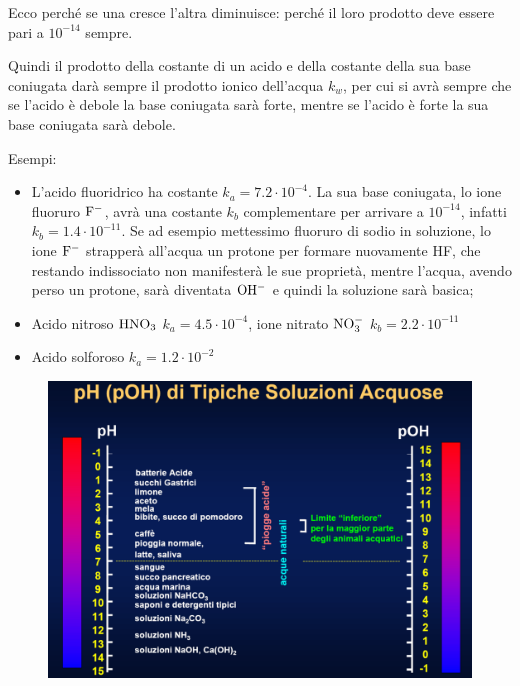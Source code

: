 Ecco perché se una cresce l'altra diminuisce: perché il loro prodotto deve essere pari a $10^{-14}$ sempre.

Quindi il prodotto della costante di un acido e della costante della sua base coniugata darà sempre il prodotto ionico dell'acqua $k_w$, per cui si avrà sempre che se l'acido è debole la base coniugata sarà forte, mentre se l'acido è forte la sua base coniugata sarà debole.

\vspace{0.2cm}Esempi:
\begin{itemize}
    \item L'acido fluoridrico ha costante $k_a=7.2 \cdot 10^{-4}$. La sua base coniugata, lo ione fluoruro $\rm F^-$, avrà una costante $k_b$ complementare per arrivare a $10^{-14}$, infatti $k_b=1.4\cdot10^{-11}$. Se ad esempio mettessimo fluoruro di sodio in soluzione, lo ione $\rm F^-$ strapperà all'acqua un protone per formare nuovamente HF, che restando indissociato non manifesterà le sue proprietà, mentre l'acqua, avendo perso un protone, sarà diventata $\rm OH^-$ e quindi la soluzione sarà basica;
    \item Acido nitroso $\rm HNO_3$ $k_a=4.5 \cdot 10^{-4}$, ione nitrato $\rm NO_3^-$ $k_b=2.2 \cdot 10^{-11}$
    \item Acido solforoso  $k_a=1.2 \cdot 10^{-2}$
\end{itemize}

\begin{figure}[H]
    \centering
    \includegraphics[width=14cm]{immagini/pH_esempi.png}
\end{figure}

